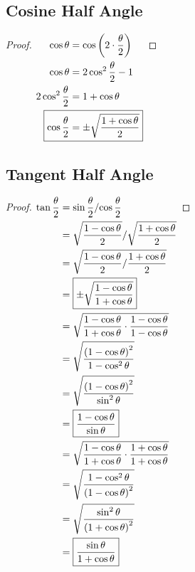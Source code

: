\documentclass{article}
\begin{document}
\subsection{Cosine Half Angle}
\label{proof:coshalf}
\begin{proof}
	$\begin{aligned}[t]
		\cos\theta&=\cos\left(2\cdot\frac{\theta}{2}\right) \\
		\cos\theta&=2\cos^2\frac{\theta}{2}-1 \\
		2\cos^2\frac{\theta}{2}&=1+\cos\theta \\
		\Aboxed{\cos\frac{\theta}{2}&=\pm\sqrt{\frac{1+\cos\theta}{2}}} \\
	\end{aligned} \\$
\end{proof}

\subsection{Tangent Half Angle}
\label{proof:tanhalf}
\begin{proof}
	$\begin{aligned}[t]
		\tan\frac{\theta}{2}&=\sin\frac{\theta}{2}/{\cos\frac{\theta}{2}} \\
		&=\sqrt{\frac{1-\cos\theta}{2}}/\sqrt{\frac{1+\cos\theta}{2}} \\
		&=\sqrt{\frac{1-\cos\theta}{2}/\frac{1+\cos\theta}{2}} \\
		&=\boxed{\pm\sqrt{\frac{1-\cos\theta}{1+\cos\theta}}} \\
		&=\sqrt{\frac{1-\cos\theta}{1+\cos\theta}\cdot\frac{1-\cos\theta}{1-\cos\theta}} \\
		&=\sqrt{\frac{\left(1-\cos\theta\right)^2}{1-\cos^2\theta}} \\
		&=\sqrt{\frac{\left(1-\cos\theta\right)^2}{\sin^2\theta}} \\
		&=\boxed{\frac{1-\cos\theta}{\sin\theta}} \\
		&=\sqrt{\frac{1-\cos\theta}{1+\cos\theta}\cdot\frac{1+\cos\theta}{1+\cos\theta}} \\
		&=\sqrt{\frac{1-\cos^2\theta}{\left(1-\cos\theta\right)^2}} \\
		&=\sqrt{\frac{\sin^2\theta}{\left(1+\cos\theta\right)^2}} \\
		&=\boxed{\frac{\sin\theta}{1+\cos\theta}} \\
	\end{aligned} \\$
\end{proof}
\end{document}
